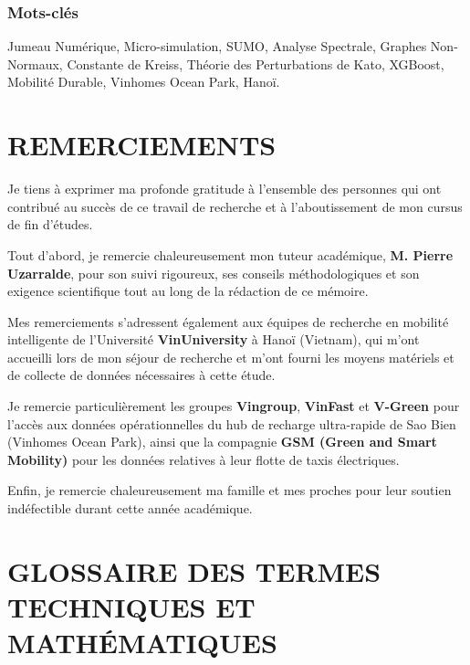 \documentclass[10pt, a4paper]{article}
\begin{document}
\subsubsection{Mots-clés}\label{mots-cluxe9s}

Jumeau Numérique, Micro-simulation, SUMO, Analyse Spectrale, Graphes
Non-Normaux, Constante de Kreiss, Théorie des Perturbations de Kato,
XGBoost, Mobilité Durable, Vinhomes Ocean Park, Hanoï.

\newpage

\section{REMERCIEMENTS}\label{remerciements}

Je tiens à exprimer ma profonde gratitude à l'ensemble des personnes qui
ont contribué au succès de ce travail de recherche et à l'aboutissement
de mon cursus de fin d'études.

Tout d'abord, je remercie chaleureusement mon tuteur académique,
\textbf{M. Pierre Uzarralde}, pour son suivi rigoureux, ses conseils
méthodologiques et son exigence scientifique tout au long de la
rédaction de ce mémoire.

Mes remerciements s'adressent également aux équipes de recherche en
mobilité intelligente de l'Université \textbf{VinUniversity} à Hanoï
(Vietnam), qui m'ont accueilli lors de mon séjour de recherche et m'ont
fourni les moyens matériels et de collecte de données nécessaires à
cette étude.

Je remercie particulièrement les groupes \textbf{Vingroup},
\textbf{VinFast} et \textbf{V-Green} pour l'accès aux données
opérationnelles du hub de recharge ultra-rapide de Sao Bien (Vinhomes
Ocean Park), ainsi que la compagnie \textbf{GSM (Green and Smart
Mobility)} pour les données relatives à leur flotte de taxis
électriques.

Enfin, je remercie chaleureusement ma famille et mes proches pour leur
soutien indéfectible durant cette année académique.

\newpage

\section{GLOSSAIRE DES TERMES TECHNIQUES ET
MATHÉMATIQUES}\label{glossaire-des-termes-techniques-et-mathuxe9matiques}
\end{document}

